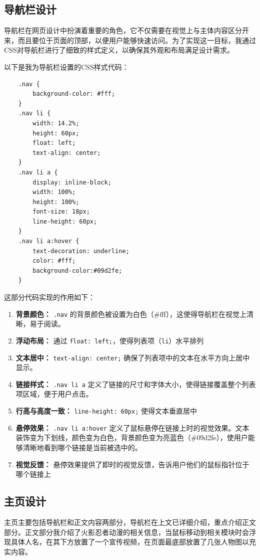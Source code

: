 \documentclass[supercite]{Experimental_Report}
\theoremstyle{definition}
\begin{document}
\subsection{导航栏设计}
导航栏在网页设计中扮演着重要的角色，它不仅需要在视觉上与主体内容区分开来，而且要位于页面的顶部，以便用户能够快速访问。为了实现这一目标，我通过CSS对导航栏进行了细致的样式定义，以确保其外观和布局满足设计需求。

以下是我为导航栏设置的CSS样式代码：

\begin{verbatim}
	.nav {
		background-color: #fff;
	}
	.nav li {
		width: 14.2%;
		height: 60px;
		float: left;
		text-align: center;
	}
	.nav li a {
		display: inline-block;
		width: 100%;
		height: 100%;
		font-size: 18px;
		line-height: 60px;
	}
	.nav li a:hover {
		text-decoration: underline;
		color: #fff;
		background-color:#09d2fe;
	}
\end{verbatim}

\newpage
这部分代码实现的作用如下：
\begin{enumerate}[label=\arabic*.]
	\item \textbf{背景颜色：} \texttt{.nav} 的背景颜色被设置为白色（\#fff），这使得导航栏在视觉上清晰，易于阅读。
	\item \textbf{浮动布局：} 通过 \texttt{float: left;}，使得列表项（\texttt{li}）水平排列
	\item \textbf{文本居中：} \texttt{text-align: center;} 确保了列表项中的文本在水平方向上居中显示。
	\item \textbf{链接样式：} \texttt{.nav li a} 定义了链接的尺寸和字体大小，使得链接覆盖整个列表项区域，便于用户点击。
	\item \textbf{行高与高度一致：} \texttt{line-height: 60px;} 使得文本垂直居中
	\item \textbf{悬停效果：} \texttt{.nav li a:hover} 定义了鼠标悬停在链接上时的视觉效果。文本装饰变为下划线，颜色变为白色，背景颜色变为亮蓝色（\#09d2fe），使用户能够清晰地看到哪个链接是当前被选中的。
	\item \textbf{视觉反馈：} 悬停效果提供了即时的视觉反馈，告诉用户他们的鼠标指针位于哪个链接上
\end{enumerate}

\newpage

\subsection{主页设计}
主页主要包括导航栏和正文内容两部分，导航栏在上文已详细介绍，重点介绍正文部分。正文部分我介绍了火影忍者动漫的相关信息，当鼠标移动到相关模块时会浮现具体人名，在其下方放置了一个宣传视频，在页面最底部放置了几张人物图以充实内容。
\end{document}
